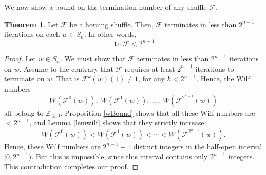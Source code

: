 \documentclass[final,nomarks]{dmtcs-episciences}
\theoremstyle{definition}
\newtheorem{thm}{Theorem}[section]
\theoremstyle{definition}
\theoremstyle{remark}
\newcommand{\f}{\mathcal{F}} %
\newcommand{\tn}{\operatorname{tn }} %
\newcommand{\tup}[1]{\left( #1 \right)}
\begin{document}
We now show a bound on the termination number of any shuffle $ \f $.
\begin{thm}
    \label{f-terminates}
    Let $ \f $ be a homing shuffle. Then, $\f$ terminates in less than $2^{n-1}$ iterations on each $w \in S_n$. In other words,
    \[
    \tn\f < 2^{n-1}
    \]
\end{thm}

\begin{proof}
    Let $w \in S_n$.
    We must show that $\f$ terminates in less than $2^{n-1}$ iterations on $w$.
Assume to the contrary that $\f$ requires at least $2^{n-1}$ iterations to terminate on $w$. That is $\f^k\tup{w} \tup{1} \neq 1$, for any $k < 2^{n-1}$.
    Hence, the Wilf numbers 
    \[
    W\tup{\f^0\tup{w}},\ W\tup{\f^1\tup{w}},\ \ldots,\ W\tup{\f^{2^{n-1}}\tup{w}}
    \] all belong to $\mathbb{Z}_{\ge 0}$. Proposition \ref{wBound} shows that all these Wilf numbers are $< 2^{n-1}$, and Lemma \ref{lemwilf} shows that they strictly increase:
    \[
    W\tup{\f^0\tup{w}} < W\tup{\f^1\tup{w}} < \cdots < W\tup{\f^{2^{n-1}}\tup{w}}.
    \]
    Hence, these Wilf numbers are $2^{n-1}+1$ distinct integers in the half-open interval $[0, 2^{n-1})$.
    But this is impossible, since this interval contains only $2^{n-1}$ integers.
    This contradiction completes our proof.
\end{proof}
\end{document}

